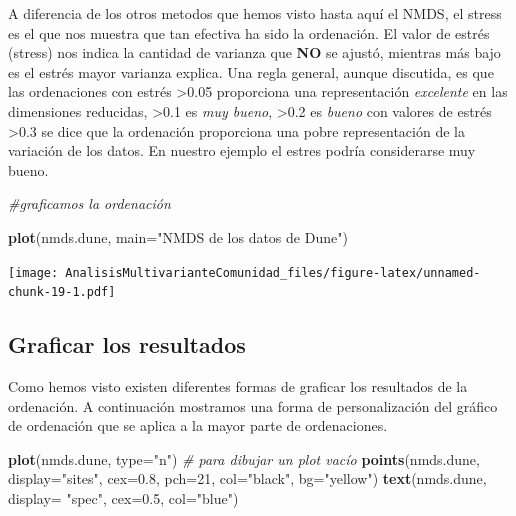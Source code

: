 \documentclass[]{book}
\newenvironment{Shaded}{\begin{snugshade}}{\end{snugshade}}
\newcommand{\KeywordTok}[1]{\textcolor[rgb]{0.13,0.29,0.53}{\textbf{{#1}}}}
\newcommand{\DataTypeTok}[1]{\textcolor[rgb]{0.13,0.29,0.53}{{#1}}}
\newcommand{\DecValTok}[1]{\textcolor[rgb]{0.00,0.00,0.81}{{#1}}}
\newcommand{\FloatTok}[1]{\textcolor[rgb]{0.00,0.00,0.81}{{#1}}}
\newcommand{\StringTok}[1]{\textcolor[rgb]{0.31,0.60,0.02}{{#1}}}
\newcommand{\CommentTok}[1]{\textcolor[rgb]{0.56,0.35,0.01}{\textit{{#1}}}}
\newcommand{\NormalTok}[1]{{#1}}
\begin{document}
A diferencia de los otros metodos que hemos visto hasta aquí el NMDS, el
stress es el que nos muestra que tan efectiva ha sido la ordenación. El
valor de estrés (stress) nos indica la cantidad de varianza que
\textbf{NO} se ajustó, mientras más bajo es el estrés mayor varianza
explica. Una regla general, aunque discutida, es que las ordenaciones
con estrés \textgreater{}0.05 proporciona una representación
\emph{excelente} en las dimensiones reducidas, \textgreater{}0.1 es
\emph{muy bueno}, \textgreater{}0.2 es \emph{bueno} con valores de
estrés \textgreater{}0.3 se dice que la ordenación proporciona una pobre
representación de la variación de los datos. En nuestro ejemplo el
estres podría considerarse muy bueno.

\begin{Shaded}
\begin{Highlighting}[]
\CommentTok{#graficamos la ordenación}

\KeywordTok{plot}\NormalTok{(nmds.dune, }\DataTypeTok{main=}\StringTok{"NMDS de los datos de Dune"}\NormalTok{)}
\end{Highlighting}
\end{Shaded}

\texttt{[image: AnalisisMultivarianteComunidad\_files/figure-latex/unnamed-chunk-19-1.pdf]}

\subsection{Graficar los resultados}\label{graficar-los-resultados}

Como hemos visto existen diferentes formas de graficar los resultados de
la ordenación. A continuación mostramos una forma de personalización del
gráfico de ordenación que se aplica a la mayor parte de ordenaciones.

\begin{Shaded}
\begin{Highlighting}[]
\KeywordTok{plot}\NormalTok{(nmds.dune, }\DataTypeTok{type=}\StringTok{"n"}\NormalTok{)  }\CommentTok{# para dibujar un plot vacío}
\KeywordTok{points}\NormalTok{(nmds.dune, }\DataTypeTok{display=}\StringTok{"sites"}\NormalTok{, }\DataTypeTok{cex=}\FloatTok{0.8}\NormalTok{, }\DataTypeTok{pch=}\DecValTok{21}\NormalTok{, }\DataTypeTok{col=}\StringTok{"black"}\NormalTok{, }\DataTypeTok{bg=}\StringTok{"yellow"}\NormalTok{)  }
\KeywordTok{text}\NormalTok{(nmds.dune, }\DataTypeTok{display=} \StringTok{"spec"}\NormalTok{, }\DataTypeTok{cex=}\FloatTok{0.5}\NormalTok{, }\DataTypeTok{col=}\StringTok{"blue"}\NormalTok{) }
\end{Highlighting}
\end{Shaded}
\end{document}
